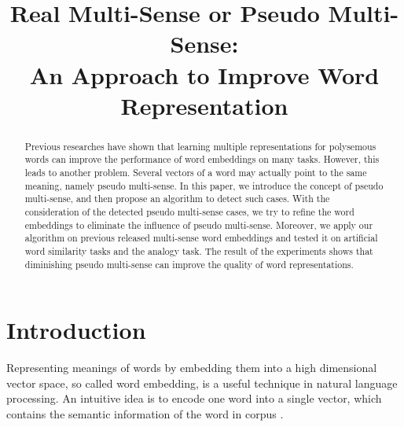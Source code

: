 \documentclass[11pt]{article}
\title{Real Multi-Sense or Pseudo Multi-Sense: \\An Approach to Improve Word Representation}
\date{}
\begin{document}
\maketitle
\begin{abstract}
Previous researches have shown that learning multiple representations for polysemous words can improve the performance of word embeddings on many tasks. However, this leads to another problem. Several vectors of a word may actually point to the same meaning, namely pseudo multi-sense. In this paper, we introduce the concept of pseudo multi-sense, and then propose an algorithm to detect such cases. With the consideration of the detected pseudo multi-sense cases, we try to refine the word embeddings to eliminate the influence of pseudo multi-sense. Moreover, we apply our algorithm on previous released multi-sense word embeddings and tested it on artificial word similarity tasks and the analogy task. The result of the experiments shows that diminishing pseudo multi-sense can improve the quality of word representations. 
\end{abstract}

\section{Introduction}

\par
Representing meanings of words by embedding them into a high dimensional vector space, so called word embedding, is a useful technique in natural language processing. An intuitive idea is to encode one word into a single vector, which contains the semantic information of the word in corpus \cite{bengio2003neural, collobert2008unified, mnih2007three, mikolov2010recurrent}.
\end{document}

